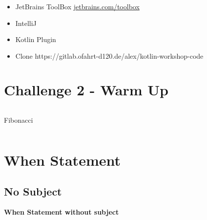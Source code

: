     \begin{frame}
        \slidehead
        \begin{itemize}[<+->]
            \item JetBrains ToolBox \url{jetbrains.com/toolbox}
            \item IntelliJ
            \item Kotlin Plugin
            \item Clone https://gitlab.ofahrt-d120.de/alex/kotlin-workshop-code
        \end{itemize}
    \end{frame}

    \section{Challenge 2 - Warm Up}\label{sec:challenge-2}
    \begin{frame}[c]
        \slidehead
        \begin{columns}[c]
            \begin{column}{.5\textwidth}
                \Large
                Fibonacci
            \end{column}
            \begin{column}{.5\textwidth}
                \centering
                
            \end{column}
        \end{columns}
    \end{frame}

    \section{When Statement}\label{sec:when-statement}

    \subsection{No Subject}\label{subsec:no-subject}
    \begin{frame}[c]
        \slidehead
        \centering
        \large
        \textbf{When Statement without subject}
        \vspace{1em}
        \normalsize
    \end{frame}

